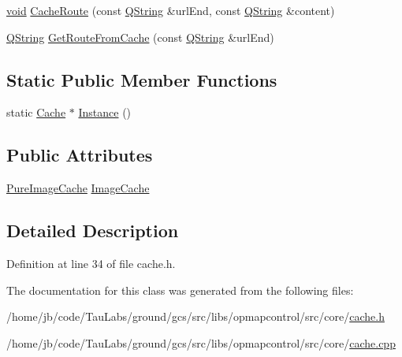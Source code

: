 \begin{DoxyCompactItemize}
\item 
\hyperlink{group___u_a_v_objects_plugin_ga444cf2ff3f0ecbe028adce838d373f5c}{void} \hyperlink{group___o_p_map_widget_ga39845c04f9d203c0a71e50b1576e71c6}{\-Cache\-Route} (const \hyperlink{group___u_a_v_objects_plugin_gab9d252f49c333c94a72f97ce3105a32d}{\-Q\-String} \&url\-End, const \hyperlink{group___u_a_v_objects_plugin_gab9d252f49c333c94a72f97ce3105a32d}{\-Q\-String} \&content)
\item 
\hyperlink{group___u_a_v_objects_plugin_gab9d252f49c333c94a72f97ce3105a32d}{\-Q\-String} \hyperlink{group___o_p_map_widget_gaa57f8065b3641c25a3305de4ab621abe}{\-Get\-Route\-From\-Cache} (const \hyperlink{group___u_a_v_objects_plugin_gab9d252f49c333c94a72f97ce3105a32d}{\-Q\-String} \&url\-End)
\end{DoxyCompactItemize}
\subsection*{\-Static \-Public \-Member \-Functions}
\begin{DoxyCompactItemize}
\item 
static \hyperlink{classcore_1_1_cache}{\-Cache} $\ast$ \hyperlink{group___o_p_map_widget_ga44699cf1986c874eb8375e3d795a1456}{\-Instance} ()
\end{DoxyCompactItemize}
\subsection*{\-Public \-Attributes}
\begin{DoxyCompactItemize}
\item 
\hyperlink{classcore_1_1_pure_image_cache}{\-Pure\-Image\-Cache} \hyperlink{group___o_p_map_widget_gab71cf242d304174673b1385ade1915bd}{\-Image\-Cache}
\end{DoxyCompactItemize}


\subsection{\-Detailed \-Description}


\-Definition at line 34 of file cache.\-h.



\-The documentation for this class was generated from the following files\-:\begin{DoxyCompactItemize}
\item 
/home/jb/code/\-Tau\-Labs/ground/gcs/src/libs/opmapcontrol/src/core/\hyperlink{cache_8h}{cache.\-h}\item 
/home/jb/code/\-Tau\-Labs/ground/gcs/src/libs/opmapcontrol/src/core/\hyperlink{cache_8cpp}{cache.\-cpp}\end{DoxyCompactItemize}
